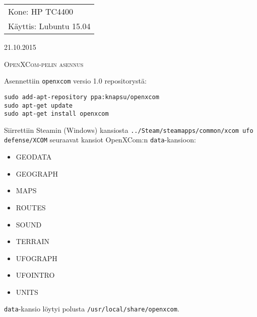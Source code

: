 \documentclass[main.tex]{subfiles}
\begin{document}
\thispagestyle{empty}
\begin{tabular}[t]{l}
Kone: HP TC4400\\
Käyttis: Lubuntu 15.04
\end{tabular}
\hfill 21.10.2015

{\scshape\Large{OpenXCom-pelin asennus}}


Asennettiin \texttt{openxcom} versio 1.0 repositorystä:

\begin{lstlisting}
sudo add-apt-repository ppa:knapsu/openxcom
sudo apt-get update
sudo apt-get install openxcom
\end{lstlisting}

 Siirrettiin Steamin (Windows) kansiosta \texttt{../Steam/steamapps/common/xcom ufo defense/XCOM} seuraavat kansiot OpenXCom:n \texttt{data}-kansioon:
\begin{itemize}
\item GEODATA
\item GEOGRAPH
\item MAPS
\item ROUTES
\item SOUND
\item TERRAIN
\item UFOGRAPH
\item UFOINTRO
\item UNITS
\end{itemize}
\texttt{data}-kansio löytyi polusta \texttt{/usr/local/share/openxcom}.
\end{document}
